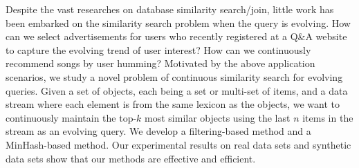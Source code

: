 
%
%



Despite the vast researches on database similarity search/join, little work has been embarked on the similarity search problem when the query is evolving.  How can we select advertisements for users who recently registered at a Q\&A website to capture the evolving trend of user interest?  How can we continuously recommend songs by user humming?  Motivated by the above application scenarios, we study a novel problem of continuous similarity search for evolving queries.  Given a set of objects, each being a set or multi-set of items, and a data stream where each element is from the same lexicon as the objects, we want to continuously maintain the top-$k$ most similar objects using the last $n$ items in the stream as an evolving query. We develop a filtering-based method and a MinHash-based method.  Our experimental results on real data sets and synthetic data sets show that our methods are effective and efficient.











